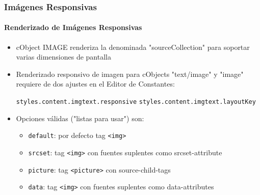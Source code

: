 \begin{frame}[fragile]
	\frametitle{Imágenes Responsivas}
	\framesubtitle{Renderizado de Imágenes Responsivas}

	\begin{itemize}
		\item cObject IMAGE renderiza la denominada "sourceCollection" para soportar varias dimensiones de pantalla
		\item Renderizado responsivo de imagen para cObjects "text/image" y "image" requiere de dos ajustes en el Editor de Constantes:

			\texttt{styles.content.imgtext.responsive}\newline
			\texttt{styles.content.imgtext.layoutKey}

		\item Opciones válidas ("listas para usar") son:

			\begin{itemize}
				\item \texttt{default}:	\tabto{2cm} por defecto tag \texttt{<img>}
				\item \texttt{srcset}:	\tabto{2cm} tag \texttt{<img>} con fuentes suplentes como srcset-attribute
				\item \texttt{picture}:	\tabto{2cm} tag \texttt{<picture>} con source-child-tags
				\item \texttt{data}:	\tabto{2cm} tag \texttt{<img>} con fuentes suplentes como data-attributes
			\end{itemize}

	\end{itemize}

\end{frame}


